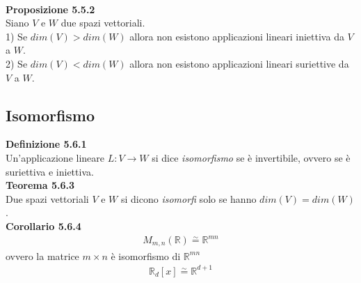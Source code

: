 \documentclass{article}
\begin{document}
\textbf{\\Proposizione 5.5.2}
\\Siano $V$ e $W$ due spazi vettoriali.
\\1) Se $dim(V) > dim(W)$ allora non esistono applicazioni lineari iniettiva da $V$ a $W$.
\\2) Se $dim(V) < dim(W)$ allora non esistono applicazioni lineari suriettive da $V$ a $W$.

\subsection{Isomorfismo}
\textbf{Definizione 5.6.1}
\\Un'applicazione lineare $L:V\to W$ si dice \textit{isomorfismo} se è invertibile, ovvero se è suriettiva e iniettiva.
\textbf{\\Teorema 5.6.3}
\\Due spazi vettoriali $V$ e $W$ si dicono \textit{isomorfi} solo se hanno $dim(V)=dim(W)$.
\textbf{\\Corollario 5.6.4}
\begin{align*}
  M_{m,n}(\mathbb{R})\overset{\sim}{=}\mathbb{R}^{mn}
\end{align*}
ovvero la matrice $m \times n$ è isomorfismo di $\mathbb{R}^{mn}$
\begin{align*}
  \mathbb{R}_d[x]\overset{\sim}{=}\mathbb{R}^{d+1}
\end{align*}

\pagebreak
\end{document}
